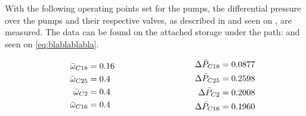 
With the following operating points set for the pumps, the differential pressure over the pumps and their respective valves, as described in  and seen on , are measured. 
The data can be found on the attached storage under the path:  and seen on \ref{eq:blablablabla}.



\begin{equation}
\centering
  \begin{minipage}[b]{0.45\textwidth}
  \begin{equation*}
  	\begin{split}
    \bar{\omega}_{C18} &= 0.16\\
	\bar{\omega}_{C25} &= 0.4\\
	\bar{\omega}_{C2}  &= 0.4\\
	\bar{\omega}_{C16} &= 0.4
  	\end{split}
  \end{equation*}
  \end{minipage}
  \hfill
  \begin{minipage}[b]{0.45\textwidth}
  \begin{equation*}
  	\begin{split}
  	\Delta \bar{P}_{C18} &= 0.0877 \\
	\Delta \bar{P}_{C25} &= 0.2598 \\
	\Delta \bar{P}_{C2} &= 0.2008 \\
	\Delta \bar{P}_{C16} &=0.1960 
  	\end{split}
  \end{equation*}
  \end{minipage}
  \label{eq:blablablabla}
\end{equation}

